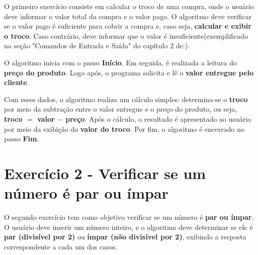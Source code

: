 \documentclass[12pt, a4paper]{article}
\begin{document}
O primeiro exercício consiste em calcular o troco de uma compra, onde o 
    usuário deve informar o valor total da compra e o valor pago. 
    O algoritmo deve verificar se o valor pago é suficiente para cobrir a compra e, 
    caso seja, \textbf{calcular e exibir o troco}. Caso contrário, deve informar que o 
    valor é insuficiente(exemplificado na seção "Comandos de Entrada e Saída" do capítulo 2 de:\cite{forbellone2005}).

O algoritmo inicia com o passo \textbf{Início}. Em seguida, é realizada a 
leitura do \textbf{preço do produto}. Logo após, o programa solicita e lê 
o \textbf{valor entregue pelo cliente}.

    Com esses dados, o algoritmo realiza um cálculo simples: determina-se o 
\textbf{troco} por meio da subtração entre o valor entregue e o preço do 
produto, ou seja, \textbf{troco $=$ valor $-$ preço}. Após o cálculo, o resultado
é apresentado ao usuário por meio da exibição do \textbf{valor do troco}. 
Por fim, o algoritmo é encerrado no passo \textbf{Fim}.

    

\section*{Exercício 2 - Verificar se um número é par ou ímpar }

\begin{center}
\end{center}

     O segundo exercício tem como objetivo verificar se um número é \textbf{par ou ímpar}.
     O usuário deve inserir um número inteiro, e o algoritmo deve determinar se 
     ele é \textbf{par (divisível por 2)} ou \textbf{ímpar (não divisível por 2)}, exibindo a 
     resposta correspondente a cada um dos casos.
     
\end{document}
